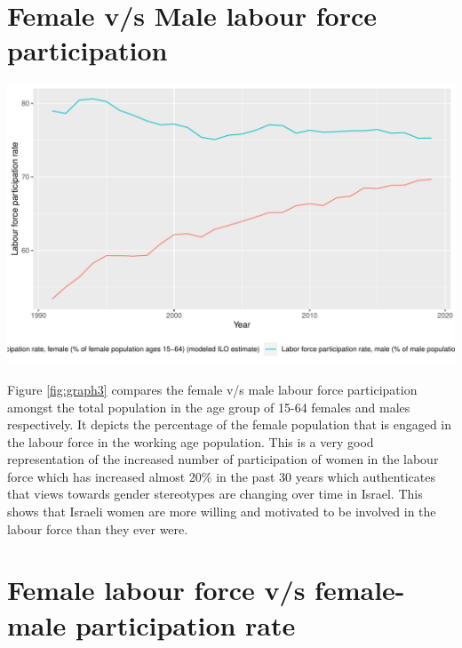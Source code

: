 \documentclass[11pt,a4paper,]{article}
\let\origfigure\figure
\let\endorigfigure\endfigure
\renewenvironment{figure}[1][2] {
    \expandafter\origfigure\expandafter[H]
} {
    \endorigfigure
}%
\begin{document}
\section{Female v/s Male labour force
participation}\label{female-vs-male-labour-force-participation}

\begin{figure}
\centering
\includegraphics{report_files/figure-latex/graph3-1.pdf}
\caption{\label{fig:graph3}Female v/s Male labour force participation}
\end{figure}

Figure \ref{fig:graph3} compares the female v/s male labour force
participation amongst the total population in the age group of 15-64
females and males respectively. It depicts the percentage of the female
population that is engaged in the labour force in the working age
population. This is a very good representation of the increased number
of participation of women in the labour force which has increased almost
20\% in the past 30 years which authenticates that views towards gender
stereotypes are changing over time in Israel. This shows that Israeli
women are more willing and motivated to be involved in the labour force
than they ever were.

\section{Female labour force v/s female-male participation
rate}\label{female-labour-force-vs-female-male-participation-rate}
\end{document}
